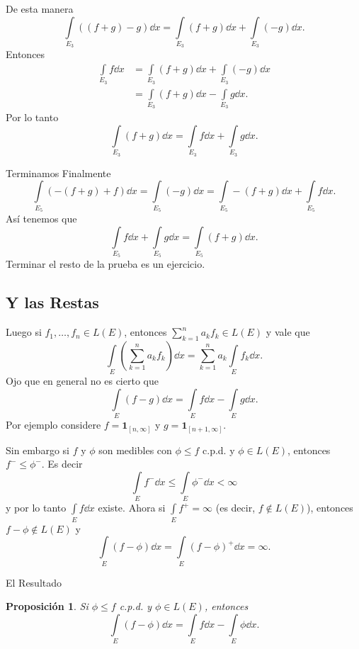 \documentclass[utf8]{beamer}
\theoremstyle{plain}
\newtheorem{Prop}{Proposición}         %
\theoremstyle{definition}
\theoremstyle{remark}
\numberwithin{equation}{section}
\newcommand{\bonj}[1]{\left\lbrack#1\right\rbrack}
\renewcommand{\leq}{\leqslant}          %
\newcommand{\ind}{\mathbf{1}}       %
\renewcommand{\.}{\Cdot}                %
\begin{document}
\begin{frame}
  De esta manera 
  $$\int\limits_{E_3}((f+g)-g)\dd x=\int\limits_{E_3}(f+g)\dd x+\int\limits_{E_3}(-g)\dd x.$$
  Entonces 
  \begin{align*}
    \int\limits_{E_3}f\dd x&=\int\limits_{E_3}(f+g)\dd x+\int\limits_{E_3}(-g)\dd x\\
    &=\int\limits_{E_3}(f+g)\dd x-\int\limits_{E_3}g\dd x.
  \end{align*}
  Por lo tanto 
  $$\int\limits_{E_3}(f+g)\dd x=\int\limits_{E_3}f\dd x+\int\limits_{E_3}g\dd x.$$
\end{frame}

\begin{frame}{Terminamos}
 Finalmente
 $$\int\limits_{E_5}(-(f+g)+f)\dd x=\int\limits_{E_5}(-g)\dd x=\int\limits_{E_5}-(f+g)\dd x+\int\limits_{E_5}f\dd x.$$
 Así tenemos que 
 $$\int\limits_{E_5}f\dd x+\int\limits_{E_5}g\dd x=\int\limits_{E_5}(f+g)\dd x.$$
Terminar el resto de la prueba es un \alert{ejercicio}.
\end{frame}

\subsection{Y las Restas}
\begin{frame}
  Luego si $f_1,\dots,f_n\in L(E)$, entonces $\sum_{k=1}^na_kf_k\in L(E)$ y vale que
  $$\int\limits_E\left(\sum_{k=1}^na_kf_k\right)\dd x=\sum_{k=1}^na_k\int\limits_Ef_k\dd x.$$
  Ojo que en general no es cierto que 
  $$\int\limits_E(f-g)\dd x=\int\limits_Ef\dd x-\int\limits_Eg\dd x.$$
  Por ejemplo considere $f=\ind_{\bonj{n,\infty}}$ y $g=\ind_{\bonj{n+1,\infty}}.$
\end{frame}

\begin{frame}
  Sin embargo si $f$ y $\phi$ son medibles con $\phi\leq f$ c.p.d. y $\phi\in L(E)$, entonces $f^-\leq \phi^-$. Es decir
  $$\int\limits_Ef^-\dd x\leq\int\limits_E\phi^-\dd x<\infty$$
   y por lo tanto $\int\limits_Ef \dd x$ existe. Ahora si $\int\limits_Ef^+=\infty$ (es decir, $f\not\in L(E)$), entonces $f-\phi\not\in L(E)$ y 
   $$\int\limits_E(f-\phi)\dd x=\int\limits_E(f-\phi)^+\dd x=\infty.$$
\end{frame}

\begin{frame}{El Resultado}
  \begin{Prop}\label{prop:restasInt}
Si $\phi\leq f$ c.p.d.
 y $\phi\in L(E)$, entonces 
 $$\int\limits_E(f-\phi)\dd x=\int\limits_Ef\dd x-\int\limits_E\phi\dd x.$$
  \end{Prop}
\end{frame}
\end{document}
